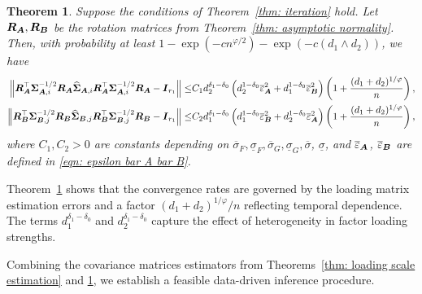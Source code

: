 \documentclass[11pt,letterpaper]{article}
\newtheorem{theorem}{Theorem}[section]
\theoremstyle{definition}
\begin{document}
\begin{theorem}\label{thm: covariance matrix}
Suppose the conditions of Theorem~\ref{thm: iteration} hold. Let $\boldsymbol{R}_{\boldsymbol{A}}, \boldsymbol{R}_{\boldsymbol{B}}$ be the rotation matrices from Theorem~\ref{thm: asymptotic normality}. Then, with probability at least $1 - \exp(-cn^{\varphi/2})- \exp(-c(d_1 \wedge d_2))$, we have
\begin{align*}
\left\|\boldsymbol{R}_{\boldsymbol{A}}^{\top}\boldsymbol{\Sigma}_{\boldsymbol{A},i}^{-1/2}\boldsymbol{R}_{\boldsymbol{A}}\widehat{\boldsymbol{\Sigma}}_{\boldsymbol{A},i}\boldsymbol{R}_{\boldsymbol{A}}^{\top}\boldsymbol{\Sigma}_{\boldsymbol{A},i}^{-1/2}\boldsymbol{R}_{\boldsymbol{A}} - \boldsymbol{I}_{r_1}\right\|
\le &  C_1 d_2^{\delta_1-\delta_0} \left( d_2^{1-\delta_0} \overline{\varepsilon}_{\boldsymbol{A}}^2 +  d_1^{1-\delta_0} \overline{\varepsilon}_{\boldsymbol{B}}^2\right)  \left(1 + \frac{(d_1+d_2)^{1/\varphi}}{n}\right)  , \\
\left\|\boldsymbol{R}_{\boldsymbol{B}}^{\top}\boldsymbol{\Sigma}_{\boldsymbol{B},j}^{-1/2}\boldsymbol{R}_{\boldsymbol{B}}\widehat{\boldsymbol{\Sigma}}_{\boldsymbol{B},j}\boldsymbol{R}_{\boldsymbol{B}}^{\top}\boldsymbol{\Sigma}_{\boldsymbol{B},j}^{-1/2}\boldsymbol{R}_{\boldsymbol{B}} - \boldsymbol{I}_{r_1}\right\| 
\le & C_2 d_1^{\delta_1-\delta_0} \left( d_1^{1-\delta_0} \overline{\varepsilon}_{\boldsymbol{B}}^2 +  d_2^{1-\delta_0} \overline{\varepsilon}_{\boldsymbol{A}}^2 \right)  \left(1 + \frac{(d_1+d_2)^{1/\varphi}}{n}\right)  ,
\end{align*}
where $C_1,C_2>0$ are constants depending on $\overline{\sigma}_{F}, \underline{\sigma}_{ F}, \overline{\sigma}_{G}, \underline{\sigma}_{G}, \overline{\sigma}$, $\underline{\sigma}$, and $\overline{\varepsilon}_{\boldsymbol{A}}$, $\overline{\varepsilon}_{\boldsymbol{B}}$ are defined in \eqref{eqn: epsilon bar A bar B}. 
\end{theorem}


Theorem~\ref{thm: covariance matrix} shows that the convergence rates are governed by the loading matrix estimation errors and a factor $(d_1+d_2)^{1/\varphi}/n$ reflecting temporal dependence. The terms $d_1^{\delta_1-\delta_0}$ and $d_2^{\delta_1-\delta_0}$ capture the effect of heterogeneity in factor loading strengths.





Combining the covariance matrices estimators from Theorems~\ref{thm: loading scale estimation} and \ref{thm: covariance matrix}, we establish a feasible data-driven inference procedure.
\end{document}
